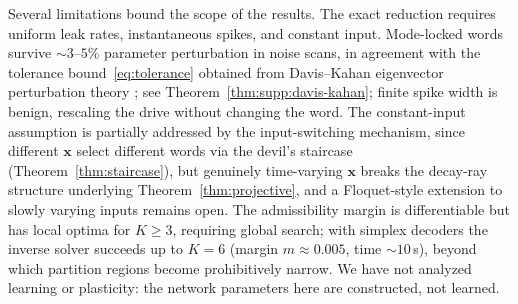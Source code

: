 \documentclass[12pt]{article}
\newcommand{\vv}[1]{\mathbf{#1}}
\newcommand{\xx}{\vv{x}}
\begin{document}
Several limitations bound the scope of the results. The exact reduction requires uniform leak rates, instantaneous spikes, and constant input. Mode-locked words survive ${\sim}3$--$5\%$ parameter perturbation in noise scans, in agreement with the tolerance bound~\eqref{eq:tolerance} obtained from Davis--Kahan eigenvector perturbation theory \citep{davis1970rotation,stewart1990matrix}; see Theorem~\ref{thm:supp:davis-kahan}; finite spike width is benign, rescaling the drive without changing the word. The constant-input assumption is partially addressed by the input-switching mechanism, since different $\xx$ select different words via the devil's staircase (Theorem~\ref{thm:staircase}), but genuinely time-varying $\xx$ breaks the decay-ray structure underlying Theorem~\ref{thm:projective}, and a Floquet-style extension to slowly varying inputs remains open. The admissibility margin is differentiable but has local optima for $K\geq 3$, requiring global search; with simplex decoders the inverse solver succeeds up to $K=6$ (margin $m\approx 0.005$, time ${\sim}10$\,s), beyond which partition regions become prohibitively narrow. We have not analyzed learning or plasticity: the network parameters here are constructed, not learned.
\end{document}
